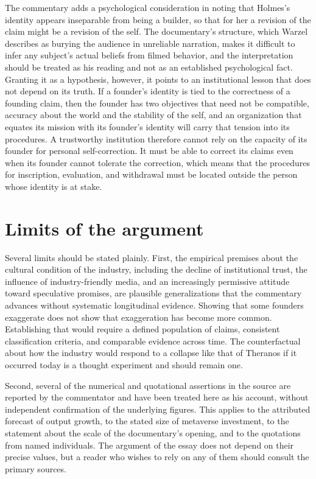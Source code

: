 \documentclass[11pt]{article}
\theoremstyle{plain}
\theoremstyle{definition}
\theoremstyle{remark}
\begin{document}
The commentary adds a psychological consideration in noting that Holmes's identity appears inseparable from being a builder, so that for her a revision of the claim might be a revision of the self. The documentary's structure, which Warzel describes as burying the audience in unreliable narration, makes it difficult to infer any subject's actual beliefs from filmed behavior, and the interpretation should be treated as his reading and not as an established psychological fact. Granting it as a hypothesis, however, it points to an institutional lesson that does not depend on its truth. If a founder's identity is tied to the correctness of a founding claim, then the founder has two objectives that need not be compatible, accuracy about the world and the stability of the self, and an organization that equates its mission with its founder's identity will carry that tension into its procedures. A trustworthy institution therefore cannot rely on the capacity of its founder for personal self-correction. It must be able to correct its claims even when its founder cannot tolerate the correction, which means that the procedures for inscription, evaluation, and withdrawal must be located outside the person whose identity is at stake.

\section{Limits of the argument}

Several limits should be stated plainly. First, the empirical premises about the cultural condition of the industry, including the decline of institutional trust, the influence of industry-friendly media, and an increasingly permissive attitude toward speculative promises, are plausible generalizations that the commentary advances without systematic longitudinal evidence. Showing that some founders exaggerate does not show that exaggeration has become more common. Establishing that would require a defined population of claims, consistent classification criteria, and comparable evidence across time. The counterfactual about how the industry would respond to a collapse like that of Theranos if it occurred today is a thought experiment and should remain one.

Second, several of the numerical and quotational assertions in the source are reported by the commentator and have been treated here as his account, without independent confirmation of the underlying figures. This applies to the attributed forecast of output growth, to the stated size of metaverse investment, to the statement about the scale of the documentary's opening, and to the quotations from named individuals. The argument of the essay does not depend on their precise values, but a reader who wishes to rely on any of them should consult the primary sources.
\end{document}
